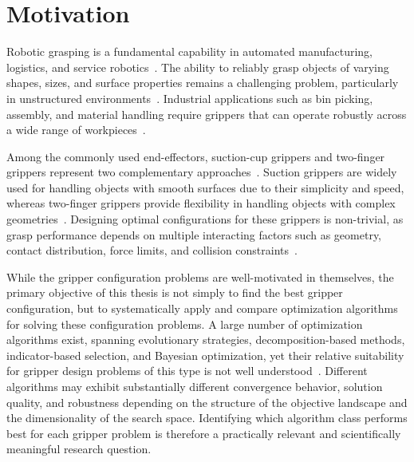 \section{Motivation}
\label{sec:motivation}

Robotic grasping is a fundamental capability in automated manufacturing, logistics, and service robotics~\cite{Todescato}. The ability to reliably grasp objects of
varying shapes, sizes, and surface properties remains a challenging problem, particularly in unstructured environments~\cite{Dinakaran2022A}. Industrial applications such
as bin picking, assembly, and material handling require grippers that can operate robustly across a wide range of workpieces~\cite{Kang2019Design}.

Among the commonly used end-effectors, suction-cup grippers and two-finger grippers represent two complementary approaches~\cite{Courchesne2023A}. Suction grippers are
widely used for handling objects with smooth surfaces due to their simplicity and speed, whereas two-finger grippers provide flexibility in handling
objects with complex geometries~\cite{Courchesne2023A, Milojevic2021A}. Designing optimal configurations for these grippers is non-trivial, as grasp performance depends on multiple
interacting factors such as geometry, contact distribution, force limits, and collision constraints~\cite{Liu2024Topology}.

While the gripper configuration problems are well-motivated in themselves, the primary objective of this thesis is not simply to find the
best gripper configuration, but to systematically apply and compare optimization algorithms for solving these configuration problems. A large
number of optimization algorithms exist, spanning evolutionary strategies, decomposition-based methods, indicator-based selection, and Bayesian
optimization, yet their relative suitability for gripper design problems of this type is not well understood~\cite{Doerterler2021Analyzing}. Different algorithms may exhibit
substantially different convergence behavior, solution quality, and robustness depending on the structure of the objective landscape and the
dimensionality of the search space. Identifying which algorithm class performs best for each gripper problem is therefore a practically relevant and
scientifically meaningful research question.~\cite{Doerterler2021Analyzing,Xiong2023A}



